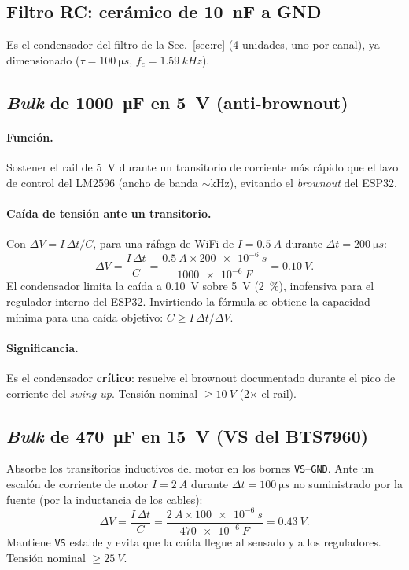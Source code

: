 \documentclass[11pt,letterpaper]{article}
\begin{document}
\subsection{Filtro RC: cerámico de \texorpdfstring{\SI{10}{nF}}{10 nF} a GND}
Es el condensador del filtro de la Sec.~\ref{sec:rc} (4 unidades, uno por canal),
ya dimensionado ($\tau=\SI{100}{\micro s}$, $f_c=\SI{1.59}{kHz}$).

\subsection{\emph{Bulk} de \texorpdfstring{\SI{1000}{\micro F}}{1000 uF} en \texorpdfstring{\SI{5}{V}}{5 V} (anti-brownout)}
\paragraph{Función.} Sostener el rail de \SI{5}{V} durante un transitorio de
corriente más rápido que el lazo de control del LM2596 (ancho de banda $\sim$\si{kHz}),
evitando el \emph{brownout} del ESP32.

\paragraph{Caída de tensión ante un transitorio.} Con $\Delta V = I\,\Delta t / C$,
para una ráfaga de WiFi de $I=\SI{0.5}{A}$ durante $\Delta t=\SI{200}{\micro s}$:
\begin{equation}
  \Delta V = \frac{I\,\Delta t}{C}
  = \frac{\SI{0.5}{A}\times\SI{200e-6}{s}}{\SI{1000e-6}{F}}
  = \SI{0.10}{V}.
\end{equation}
El condensador limita la caída a \SI{0.10}{V} sobre \SI{5}{V} (\SI{2}{\percent}),
inofensiva para el regulador interno del ESP32. Invirtiendo la fórmula se obtiene
la capacidad mínima para una caída objetivo: $C \ge I\,\Delta t/\Delta V$.

\paragraph{Significancia.} Es el condensador \textbf{crítico}: resuelve el brownout
documentado durante el pico de corriente del \emph{swing-up}. Tensión nominal
$\ge\SI{10}{V}$ (2$\times$ el rail).

\subsection{\emph{Bulk} de \texorpdfstring{\SI{470}{\micro F}}{470 uF} en \texorpdfstring{\SI{15}{V}}{15 V} (VS del BTS7960)}
Absorbe los transitorios inductivos del motor en los bornes \texttt{VS}--\texttt{GND}.
Ante un escalón de corriente de motor $I=\SI{2}{A}$ durante $\Delta t=\SI{100}{\micro s}$
no suministrado por la fuente (por la inductancia de los cables):
\begin{equation}
  \Delta V = \frac{I\,\Delta t}{C}
  = \frac{\SI{2}{A}\times\SI{100e-6}{s}}{\SI{470e-6}{F}}
  = \SI{0.43}{V}.
\end{equation}
Mantiene \texttt{VS} estable y evita que la caída llegue al sensado y a los
reguladores. Tensión nominal $\ge\SI{25}{V}$.
\end{document}
